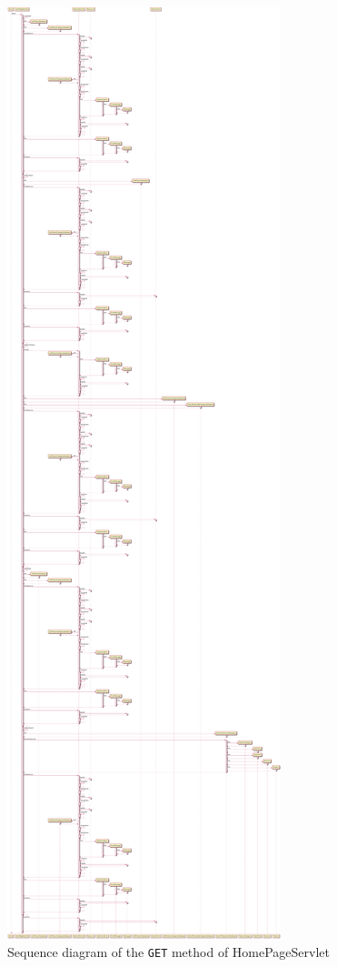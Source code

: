 \begin{figure}[H]
    \centering
    \includegraphics[width=\textwidth,height=0.95\textheight,keepaspectratio]{Schemas/HomePageServlet_doGet.svg.pdf}
    \caption{Sequence diagram of the \texttt{GET} method of HomePageServlet}
    \label{fig:HomePageServlet_doGet}
\end{figure}

